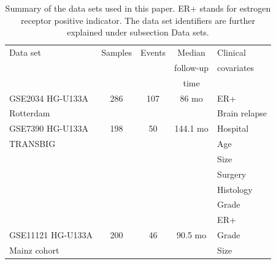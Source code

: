 \documentclass[letterpaper,12pt]{article}
\begin{document}
\begin{table}[h]
\centering
\caption{Summary of the data sets used in this paper. ER+ stands for estrogen receptor positive indicator. The data set identifiers are further explained under subsection Data sets.}
\label{Table:DataSets}
\begin{small}
    \begin{tabular}{ | l | c | c | c | l |} 
    \hline
    Data set & Samples & Events & Median & Clinical \\ &&& follow-up & covariates \\&&& time & \\ \hline \hline
    GSE2034 HG-U133A		& 286 	& 107 & 86 mo & ER+\\ 
		Rotterdam &&&& Brain relapse\\\hline
		GSE7390 HG-U133A		& 198 	& 50 	& 144.1 mo & Hospital \\ TRANSBIG  &&&& Age\\ &&&& Size\\&&&& Surgery\\&&&& Histology\\&&&& Grade\\&&&& ER+\\\hline
		GSE11121 HG-U133A		& 200 	& 46 	& 90.5 mo & Grade\\ 
		Mainz cohort &&&& Size\\\hline
    \end{tabular}
\end{small}
\end{table}
\end{document}
